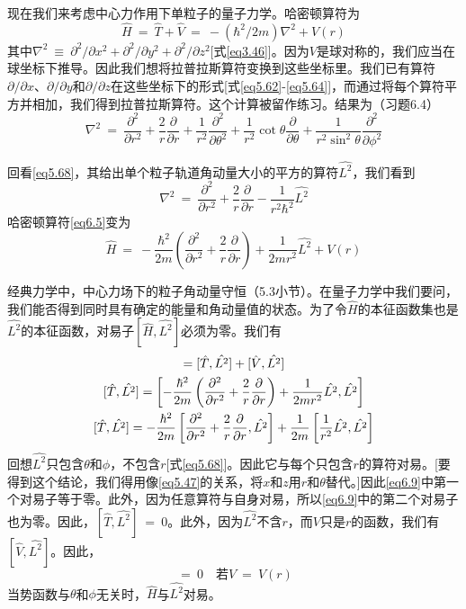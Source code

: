 \documentclass[12pt,a4paper,openany]{ctexbook}
\newcommand{\Ham}{\hat{H}}
\begin{document}
\begin{flushleft}
现在我们来考虑中心力作用下单粒子的量子力学。哈密顿算符为
\begin{equation}
    \Ham\ =\ \hat{T}+\hat{V}\ =\ -(\hbar^2/2m)\nabla^2+V(r) \label{eq6.5}
\end{equation}
其中$\nabla^2\ \equiv\ \partial^2/\partial x^2+\partial^2/\partial y^2+\partial^2/\partial z^2$[式\eqref{eq3.46}]。因为$V$是球对称的，我们应当在球坐标下推导。因此我们想将拉普拉斯算符变换到这些坐标里。我们已有算符$\partial/\partial x$、$\partial/\partial y$和$\partial/\partial z$在这些坐标下的形式[式\eqref{eq5.62}-\eqref{eq5.64}]，而通过将每个算符平方并相加，我们得到拉普拉斯算符。这个计算被留作练习。结果为（习题6.4）
\begin{equation}
    \nabla^2\ =\ \frac{\partial^2}{\partial r^2}+\frac{2}{r}\frac{\partial}{\partial r}+\frac{1}{r^2}\frac{\partial^2}{\partial \theta^2}+\frac{1}{r^2}\cot\theta\frac{\partial}{\partial\theta}+\frac{1}{r^2\sin^2\theta}\frac{\partial^2}{\partial\phi^2} \label{eq6.6}
\end{equation}

回看\eqref{eq5.68}，其给出单个粒子轨道角动量大小的平方的算符$\hat{L^2}$，我们看到
\begin{equation}
    \nabla^2\ =\ \frac{\partial^2}{\partial r^2}+\frac{2}{r}\frac{\partial}{\partial r}-\frac{1}{r^2\hbar^2}\hat{L^2} \label{eq6.7}
\end{equation}
哈密顿算符\eqref{eq6.5}变为
\begin{equation}
    \Ham\ =\ -\frac{\hbar^2}{2m}(\frac{\partial^2}{\partial r^2}+\frac{2}{r}\frac{\partial}{\partial r})+\frac{1}{2mr^2}\hat{L^2}+V(r) \label{eq6.8}
\end{equation}

经典力学中，中心力场下的粒子角动量守恒（5.3小节）。在量子力学中我们要问，我们能否得到同时具有确定的能量和角动量值的状态。为了令$\Ham$的本征函数集也是$\hat{L^2}$的本征函数，对易子$[\Ham,\hat{L^2}]$必须为零。我们有
\begin{gather}
    [\hat{H}, \hat{L^2}] = [\hat{T}, \hat{L^2}] + [\hat{V}, \hat{L^2}] \notag \\
    [\hat{T}, \hat{L^2}] = \left[ -\frac{\hbar^2}{2m}\left( \frac{\partial^2}{\partial r^2} + \frac{2}{r}\frac{\partial}{\partial r} \right) + \frac{1}{2mr^2}\hat{L^2}, \hat{L^2} \right] \notag \\
    [\hat{T}, \hat{L^2}] = -\frac{\hbar^2}{2m}\left[ \frac{\partial^2}{\partial r^2} + \frac{2}{r}\frac{\partial}{\partial r}, \hat{L^2} \right] + \frac{1}{2m}\left[ \frac{1}{r^2}\hat{L^2}, \hat{L^2} \right] \label{eq6.9}
\end{gather}
回想$\hat{L^2}$只包含$\theta$和$\phi$，不包含$r$[式\eqref{eq5.68}]。因此它与每个只包含$r$的算符对易。[要得到这个结论，我们得用像\eqref{eq5.47}的关系，将$x$和$z$用$r$和$\theta$替代。]因此\eqref{eq6.9}中第一个对易子等于零。此外，因为任意算符与自身对易，所以\eqref{eq6.9}中的第二个对易子也为零。因此，$[\hat{T},\hat{L^2}]\ =\ 0$。此外，因为$\hat{L^2}$不含$r$，而$V$只是$r$的函数，我们有$[\hat{V},\hat{L^2}]$。因此，
\begin{equation}
    [\Ham,\hat{L^2}]\ =\ 0\quad\text{若}V\ =\ V(r) \label{eq6.10}
\end{equation}
当势函数与$\theta$和$\phi$无关时，$\Ham$与$\hat{L^2}$对易。


\end{flushleft}
\end{document}
